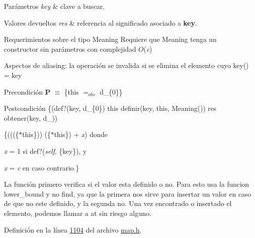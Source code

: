 \begin{DoxyParams}{Parámetros}
{\em key} & clave a buscar. \\
\hline
\end{DoxyParams}

\begin{DoxyRetVals}{Valores devueltos}
{\em res} & referencia al significado asociado a {\bfseries key}.\\
\hline
\end{DoxyRetVals}
\begin{DoxyParagraph}{Requerimientos sobre el tipo Meaning}
Requiere que Meaning tenga un constructor sin parámetros con complejidad $O$({\itshape c})
\end{DoxyParagraph}
\begin{DoxyParagraph}{Aspectos de aliasing\+:}
la operación se invalida si se elimina el elemento cuyo key() = key
\end{DoxyParagraph}
\begin{DoxyPrecond}{Precondición}
{\bfseries P} $\equiv$ \{this $=_{obs}$ d\+\_\+\{0\}\} 
\end{DoxyPrecond}
\begin{DoxyPostcond}{Postcondición}
\{(def?(key, d\+\_\+\{0\})  this  definir(key, this, Meaning())  res  obtener(key, d\+\_))
\end{DoxyPostcond}
\{(((\{$\ast$this\}))  (\{$\ast$this\}) + {\itshape x}) donde
\begin{DoxyItemize}
\item {\itshape x} = 1 si def?({\itshape self}, \{key\}), y
\item {\itshape x} = {\itshape c} en caso contrario.\}
\end{DoxyItemize}

La función primero verifica si el valor esta definido o no. Para esto usa la funcion lower\+\_\+bound y no find, ya que la primera nos sirve para insertar un valor en caso de que no este definido, y la segunda no. Una vez encontrado o insertado el elemento, podemos llamar a at sin riesgo alguno. 

Definición en la línea \hyperlink{map_8h_source_l01104}{1104} del archivo \hyperlink{map_8h_source}{map.\+h}.

\mbox{\label{classaed2_1_1map_afd0fc1a8234888e61e0e615de7e245b8_afd0fc1a8234888e61e0e615de7e245b8}} 

